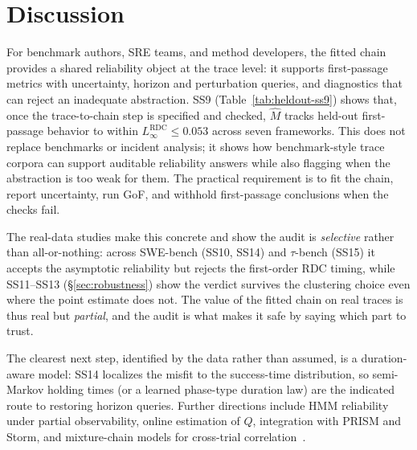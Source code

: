 \section{Discussion}
\label{sec:disc}

For benchmark authors, SRE teams, and method developers, the fitted
chain provides a shared reliability object at the trace level: it
supports first-passage metrics with uncertainty, horizon and
perturbation queries, and diagnostics that can reject an inadequate
abstraction. SS9 (Table~\ref{tab:heldout-ss9}) shows that, once the
trace-to-chain step is specified and checked, $\hat M$ tracks held-out
first-passage behavior to within $L_\infty^{\mathrm{RDC}}\le 0.053$
across seven frameworks. This does not replace benchmarks or incident
analysis; it shows how benchmark-style trace corpora can support
auditable reliability answers while also flagging when the abstraction
is too weak for them. The practical requirement is to fit the chain,
report uncertainty, run GoF, and withhold first-passage conclusions
when the checks fail.

The real-data studies make this concrete and show the audit is
\emph{selective} rather than all-or-nothing: across SWE-bench (SS10,
SS14) and $\tau$-bench (SS15) it accepts the asymptotic reliability but
rejects the first-order RDC timing, while SS11--SS13
(\S\ref{sec:robustness}) show the verdict survives the clustering
choice even where the point estimate does not. The value of the fitted
chain on real traces is thus real but \emph{partial}, and the audit is
what makes it safe by saying which part to trust.

The clearest next step, identified by the data rather than assumed, is a
duration-aware model: SS14 localizes the misfit to the success-time
distribution, so semi-Markov holding times (or a learned phase-type
duration law) are the indicated route to restoring horizon queries.
Further directions include HMM reliability under partial observability,
online estimation of $Q$, integration with PRISM and Storm, and
mixture-chain models for cross-trial correlation~\cite{spaeh2024}.

